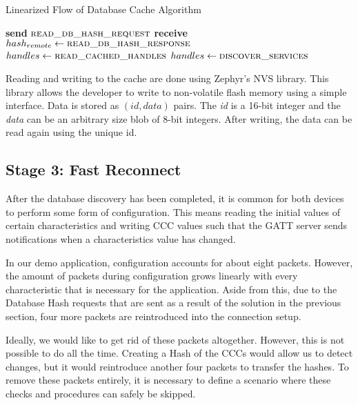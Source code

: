 \begin{algorithm}
    \caption{Linearized Flow of Database Cache Algorithm}
    \label{alg:zephyr_caching}
    \begin{algorithmic}[1] 
            \State \textbf{send} $\Call{read\_db\_hash\_request}{}$
            \State \textbf{receive} $hash_{remote} \gets \Call{read\_db\_hash\_response}{}$
                    \State $handles \gets \Call{read\_cached\_handles}{}$
                    \State {}
                    \State \Return
                \EndIf
            \EndIf
            \State $handles \gets\Call{discover\_services}{}$
            \State {}
            \State {}
        \EndProcedure
    \end{algorithmic}
\end{algorithm}

Reading and writing to the cache are done using Zephyr's NVS library. This library allows the developer to write to non-volatile flash memory using a simple interface. Data is stored as $(id, data)$ pairs. The \textit{id} is a 16-bit integer and the \textit{data} can be an arbitrary size blob of 8-bit integers. After writing, the data can be read again using the unique id.


\subsection{Stage 3: Fast Reconnect}
After the database discovery has been completed, it is common for both devices to perform some form of configuration. This means reading the initial values of certain characteristics and writing CCC values such that the GATT server sends notifications when a characteristics value has changed. 

In our demo application, configuration accounts for about eight packets. However, the amount of packets during configuration grows linearly with every characteristic that is necessary for the application. Aside from this, due to the Database Hash requests that are sent as a result of the solution in the previous section, four more packets are reintroduced into the connection setup.

Ideally, we would like to get rid of these packets altogether. However, this is not possible to do all the time. Creating a Hash of the CCCs would allow us to detect changes, but it would reintroduce another four packets to transfer the hashes. To remove these packets entirely, it is necessary to define a scenario where these checks and procedures can safely be skipped.

